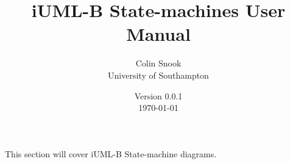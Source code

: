 \documentclass[a4paper,10pt]{article}
\title{iUML-B State-machines User Manual}
\author{Colin Snook\\University of Southampton}
\date{%
	Version 0.0.1\\%
	\today%
}
\begin{document}
	\ifplastex%
	\maketitle%
	\else%
	\ifstandalone%
	\maketitle %
	\else%
	\fi%
	\fi%
	
	This section will cover iUML-B State-machine diagrams.
	
	
\end{document}
